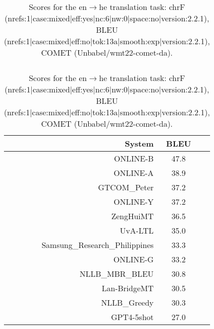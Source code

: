 \documentclass[11pt]{article}
\begin{document}
\begin{table}
\begin{subtable}[t]{0.33\textwidth}
\begin{tabular}{rcc}
\end{tabular} 
\end{subtable} 
\begin{subtable}[t]{0.33\textwidth}
\begin{tabular}{rcc}
\toprule 
System  & BLEU \\ 
\midrule 
\rowcolor{ashgrey} ONLINE-B  & 47.8 \\ 
\rowcolor{ashgrey} ONLINE-A  & 38.9 \\ 
\rowcolor{ashgrey} GTCOM\_Peter  & 37.2 \\ 
\rowcolor{ashgrey} ONLINE-Y  & 37.2 \\ 
\rowcolor{ashgrey} ZengHuiMT  & 36.5 \\ 
UvA-LTL  & 35.0 \\ 
Samsung\_Research\_Philippines & 33.3 \\ 
\rowcolor{ashgrey} ONLINE-G  & 33.2 \\ 
\rowcolor{ashgrey} NLLB\_MBR\_BLEU  & 30.8 \\ 
\rowcolor{ashgrey} Lan-BridgeMT  & 30.5 \\ 
\rowcolor{ashgrey} NLLB\_Greedy  & 30.3 \\ 
\rowcolor{ashgrey} GPT4-5shot  & 27.0 \\ 
\bottomrule 
\end{tabular} 
\end{subtable} 
\caption{Scores for the en$\rightarrow$he translation task: chrF (nrefs:1|case:mixed|eff:yes|nc:6|nw:0|space:no|version:2.2.1), BLEU (nrefs:1|case:mixed|eff:no|tok:13a|smooth:exp|version:2.2.1), COMET (Unbabel/wmt22-comet-da).} 
\end{table} 
\end{document}

